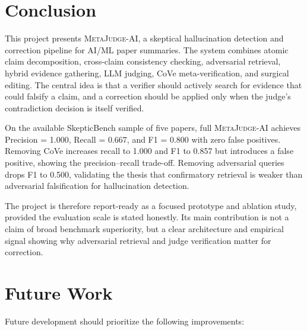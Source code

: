 \documentclass[12pt, a4paper]{report}
\newcommand{\sys}{\textsc{MetaJudge-AI}}
\begin{document}
\section{Conclusion}
\label{Conclusion}

This project presents \sys{}, a skeptical hallucination detection and correction
pipeline for AI/ML paper summaries. The system combines atomic claim
decomposition, cross-claim consistency checking, adversarial retrieval, hybrid
evidence gathering, LLM judging, CoVe meta-verification, and surgical editing.
The central idea is that a verifier should actively search for evidence that
could falsify a claim, and a correction should be applied only when the judge's
contradiction decision is itself verified.

On the available SkepticBench sample of five papers, full \sys{} achieves
Precision = 1.000, Recall = 0.667, and F1 = 0.800 with zero false positives.
Removing CoVe increases recall to 1.000 and F1 to 0.857 but introduces a false
positive, showing the precision--recall trade-off. Removing adversarial queries
drops F1 to 0.500, validating the thesis that confirmatory retrieval is weaker
than adversarial falsification for hallucination detection.

The project is therefore report-ready as a focused prototype and ablation study,
provided the evaluation scale is stated honestly. Its main contribution is not a
claim of broad benchmark superiority, but a clear architecture and empirical
signal showing why adversarial retrieval and judge verification matter for
correction.

\section{Future Work}
\label{Future Work}

Future development should prioritize the following improvements:
\end{document}
